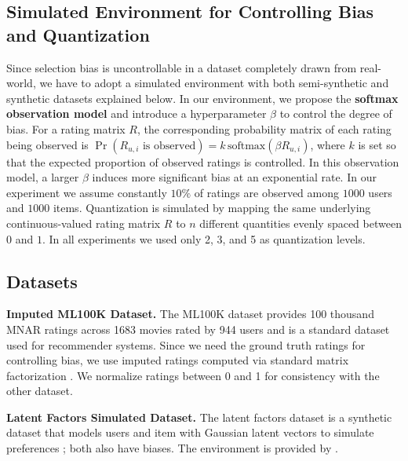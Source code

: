 \documentclass{article}
\begin{document}
\subsection{Simulated Environment for Controlling Bias and Quantization}
Since selection bias is uncontrollable in a dataset completely drawn from real-world, we have to adopt a simulated environment \cite{krauth2020offline} with both semi-synthetic and synthetic datasets explained below. In our environment, we propose the \textbf{softmax observation model} and introduce a hyperparameter $\beta$ to control the degree of bias. For a rating matrix $R$, the corresponding probability matrix of each rating being observed is $\Pr(R_{u,i}\text{ is observed}) = k\,\text{softmax}(\beta R_{u,i})$, where $k$ is set so that the expected proportion of observed ratings is controlled. In this observation model, a larger $\beta$ induces more significant bias at an exponential rate. In our experiment we assume constantly $10\%$ of ratings are observed among $1000$ users and $1000$ items. Quantization is simulated by mapping the same underlying continuous-valued rating matrix $R$ to $n$ different quantities evenly spaced between $0$ and $1$. In all experiments we used only 2, 3, and 5 as quantization levels.


\subsection{Datasets}
\textbf{Imputed ML100K Dataset.}
The ML100K dataset provides 100 thousand MNAR ratings across 1683 movies rated by 944 users and is a standard dataset used for recommender systems. Since we need the ground truth ratings for controlling bias, we use imputed ratings computed via standard matrix factorization \cite{krauth2020offline}. We normalize ratings between 0 and 1 for consistency with the other dataset. 

\textbf{Latent Factors Simulated Dataset.}
The latent factors dataset is a synthetic dataset that models users and item with Gaussian latent vectors to simulate preferences \cite{koren2008factorization,koren2009matrix}; both also have biases. The environment is provided by \cite{krauth2020offline}.
\end{document}
